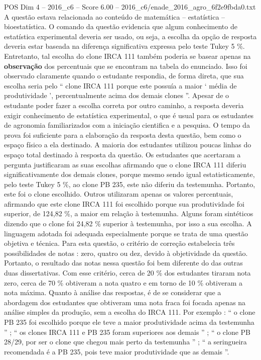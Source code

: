 \begin{textsample}{POS Dim 4 – 2016\_c6 – Score 6.00 – 2016\_c6/enade\_2016\_agro\_6f2e9fbda0.txt}
A questão estava relacionada ao conteúdo de matemática – estatística – bioestatística.
O comando da questão evidencia que algum conhecimento de estatística experimental deveria ser usado, ou seja, a escolha da opção de resposta deveria estar baseada na diferença significativa expressa pelo teste Tukey 5 \%.
Entretanto, tal escolha do clone IRCA 111 também poderia se basear apenas na \textbf{observação} dos percentuais que se encontram na tabela do enunciado.
Isso foi observado claramente quando o estudante respondia, de forma direta, que sua escolha seria pelo “ clone IRCA 111 porque este possuía a maior ‘ média de produtividade ’, percentualmente acima dos demais clones ”.
Apesar de o estudante poder fazer a escolha correta por outro caminho, a resposta deveria exigir conhecimento de estatística experimental, o que é usual para os estudantes de agronomia familiarizados com a iniciação cientifica e a pesquisa.
O tempo da prova foi suficiente para a elaboração da resposta desta questão, bem como o espaço físico a ela destinado.
A maioria dos estudantes utilizou poucas linhas do espaço total destinado à resposta da questão.
Os estudantes que acertaram a pergunta justificaram as suas escolhas afirmando que o clone IRCA 111 diferiu significativamente dos demais clones, porque mesmo sendo igual estatisticamente, pelo teste Tukey 5 \%, ao clone PB 235, este não diferiu da testemunha.
Portanto, este foi o clone escolhido.
Outros utilizaram apenas os valores percentuais, afirmando que este clone IRCA 111 foi escolhido porque sua produtividade foi superior, de 124,82 \%, a maior em relação à testemunha.
Alguns foram sintéticos dizendo que o clone foi 24,82 \% superior à testemunha, por isso a sua escolha.
A linguagem adotada foi adequada especialmente porque se trata de uma questão objetiva e técnica.
Para esta questão, o critério de correção estabelecia três possibilidades de notas : zero, quatro ou dez, devido à objetividade da questão.
Portanto, o resultado das notas nessa questão foi bem diferente do das outras duas dissertativas.
Com esse critério, cerca de 20 \% dos estudantes tiraram nota zero, cerca de 70 \% obtiveram a nota quatro e em torno de 10 \% obtiveram a nota máxima.
Quanto à análise das respostas, é de se considerar que a abordagem dos estudantes que obtiveram uma nota fraca foi focada apenas na análise simples da produção, sem a escolha do IRCA 111.
Por exemplo : “ o clone PB 235 foi escolhido porque ele teve a maior produtividade acima da testemunha ” ; “ os clones IRCA 111 e PB 235 foram superiores aos demais ” ; “ o clone PB 28/29, por ser o clone que chegou mais perto da testemunha ” ; “ a seringueira recomendada é a PB 235, pois teve maior produtividade que as demais ”.

\end{textsample}
